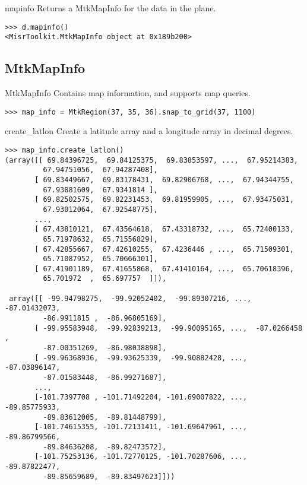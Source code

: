 \documentclass{howto}
\begin{document}
\begin{methoddesc}{mapinfo}{}
  Returns a MtkMapInfo for the data in the plane.

\begin{verbatim}
>>> d.mapinfo()
<MisrToolkit.MtkMapInfo object at 0x189b200>
\end{verbatim}
\end{methoddesc}


\subsection{MtkMapInfo \label{mtkmapinfo}}

\begin{classdesc*}{MtkMapInfo}
  Contains map information, and supports map queries.
  
\begin{verbatim}
>>> map_info = MtkRegion(37, 35, 36).snap_to_grid(37, 1100)
\end{verbatim}
\end{classdesc*}

\begin{methoddesc}{create_latlon}{}
    Create a latitude array and a longitude array in decimal degrees.

\begin{verbatim}
>>> map_info.create_latlon()
(array([[ 69.84396725,  69.84125375,  69.83853597, ...,  67.95214383,
         67.94751056,  67.94287408],
       [ 69.83449667,  69.83178431,  69.82906768, ...,  67.94344755,
         67.93881609,  67.9341814 ],
       [ 69.82502575,  69.82231453,  69.81959905, ...,  67.93475031,
         67.93012064,  67.92548775],
       ..., 
       [ 67.43810121,  67.43564618,  67.43318732, ...,  65.72400133,
         65.71978632,  65.71556829],
       [ 67.42855667,  67.42610255,  67.4236446 , ...,  65.71509301,
         65.71087952,  65.70666301],
       [ 67.41901189,  67.41655868,  67.41410164, ...,  65.70618396,
         65.701972  ,  65.697757  ]]),
         
 array([[ -99.94798275,  -99.92052402,  -99.89307216, ...,  -87.01432073,
         -86.9911815 ,  -86.96805169],
       [ -99.95583948,  -99.92839213,  -99.90095165, ...,  -87.0266458 ,
         -87.00351269,  -86.98038898],
       [ -99.96368936,  -99.93625339,  -99.90882428, ...,  -87.03896147,
         -87.01583448,  -86.99271687],
       ..., 
       [-101.7397708 , -101.71492204, -101.69007822, ...,  -89.85775933,
         -89.83612005,  -89.81448799],
       [-101.74615355, -101.72131411, -101.69647961, ...,  -89.86799566,
         -89.84636208,  -89.82473572],
       [-101.75253136, -101.72770125, -101.70287606, ...,  -89.87822477,
         -89.85659689,  -89.83497623]]))
\end{verbatim}
\end{methoddesc}
\end{document}
